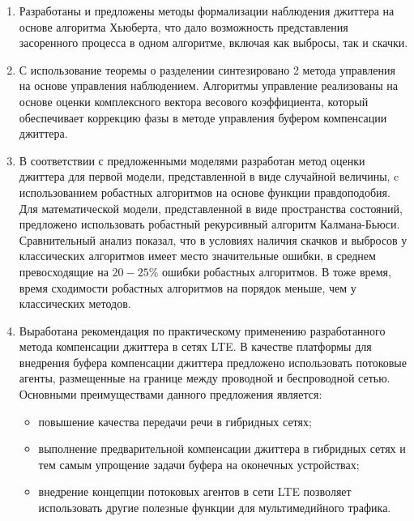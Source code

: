 \begin{enumerate}
 \item Разработаны и предложены методы формализации наблюдения джиттера
 на основе алгоритма Хьюберта, что дало возможность представления засоренного процесса в одном алгоритме, включая как выбросы, так и скачки.
 
 \item С использование теоремы о разделении синтезировано 2 метода управления на основе управления наблюдением.
 Алгоритмы управление реализованы на основе оценки комплексного вектора весового коэффициента, который обеспечивает коррекцию фазы в методе управления буфером компенсации джиттера.
 

 
 \item В соответствии с предложенными моделями разработан метод оценки джиттера для первой модели, представленной в виде случайной величины, 
 c использованием робастных алгоритмов на основе функции правдоподобия.
 Для математической модели, представленной в виде пространства состояний, предложено использовать робастный рекурсивный алгоритм Калмана-Бьюси.
 Сравнительный анализ показал, что в условиях наличия скачков и выбросов у классических алгоритмов имеет место значительные ошибки, в среднем превосходящие на $20-25\%$ ошибки робастных алгоритмов.
 В тоже время, время сходимости робастных алгоритмов на порядок меньше, чем у классических методов.
 
 \item Выработана рекомендация по практическому применению разработанного метода компенсации джиттера в сетях LTE.
 В качестве платформы для внедрения буфера компенсации джиттера предложено использовать потоковые агенты, размещенные на границе между проводной и беспроводной сетью.
 Основными преимуществами данного предложения является:
 \begin{itemize}
  \item повышение качества передачи речи в гибридных сетях;
  \item выполнение предварительной компенсации джиттера в гибридных сетях и тем самым упрощение задачи буфера на оконечных устройствах;
  \item внедрение концепции потоковых агентов в сети LTE позволяет использовать другие полезные функции для мультимедийного трафика.
 \end{itemize}
 
\end{enumerate}
